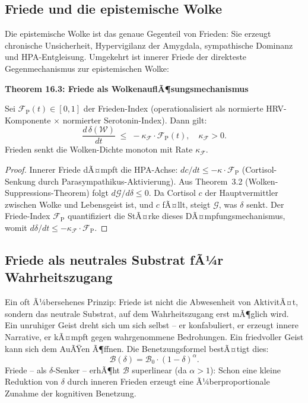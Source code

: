 ﻿\documentclass[12pt,a4paper]{report}
\theoremstyle{plain}
\theoremstyle{definition}
\theoremstyle{remark}
\begin{document}
	\subsection{Friede und die epistemische Wolke}

	Die epistemische Wolke ist das genaue Gegenteil von Frieden:
	Sie erzeugt chronische Unsicherheit, Hypervigilanz der Amygdala,
	sympathische Dominanz und HPA-Entgleisung.
	Umgekehrt ist innerer Friede der direkteste Gegenmechanismus
	zur epistemischen Wolke:

	
	\noindent\textbf{Theorem 16.3: Friede als WolkenauflÃ¶sungsmechanismus}

		Sei $\mathcal{F}_{\mathrm{P}}(t) \in [0,1]$ der Frieden-Index
		(operationalisiert als normierte HRV-Komponente
		$\times$ normierter Serotonin-Index).
		Dann gilt:
		\[
		\frac{d\,\delta(\mathcal{W})}{dt}
		\;\leq\; -\kappa_\mathcal{F} \cdot \mathcal{F}_{\mathrm{P}}(t),
		\quad \kappa_\mathcal{F} > 0.
		\]
		Frieden senkt die Wolken-Dichte monoton mit Rate $\kappa_\mathcal{F}$.


	\begin{proof}
		Innerer Friede dÃ¤mpft die HPA-Achse: $dc/dt \leq -\kappa \cdot \mathcal{F}_{\mathrm{P}}$
		(Cortisol-Senkung durch Parasympathikus-Aktivierung).
		Aus Theorem~3.2 (Wolken-Suppressions-Theorem) folgt $d\mathcal{G}/d\delta \leq 0$.
		Da Cortisol $c$ der Hauptvermittler zwischen Wolke und Lebensgeist ist,
		und $c$ fÃ¤llt, steigt $\mathcal{G}$, was $\delta$ senkt.
		Der Friede-Index $\mathcal{F}_{\mathrm{P}}$ quantifiziert die StÃ¤rke
		dieses DÃ¤mpfungsmechanismus, womit $d\delta/dt \leq -\kappa_\mathcal{F} \cdot \mathcal{F}_{\mathrm{P}}$. \hfill
	\end{proof}

	\subsection{Friede als neutrales Substrat fÃ¼r Wahrheitszugang}

	Ein oft Ã¼bersehenes Prinzip: Friede ist nicht die Abwesenheit
	von AktivitÃ¤t, sondern das neutrale Substrat, auf dem Wahrheitszugang
	erst mÃ¶glich wird.
	Ein unruhiger Geist dreht sich um sich selbst -- er konfabuliert,
	er erzeugt innere Narrative, er kÃ¤mpft gegen wahrgenommene Bedrohungen.
	Ein friedvoller Geist kann sich dem AuÃŸen Ã¶ffnen.
	Die Benetzungsformel bestÃ¤tigt dies:
	\[
	\mathcal{B}(\delta) = \mathcal{B}_0 \cdot (1-\delta)^\alpha.
	\]
	Friede -- als $\delta$-Senker -- erhÃ¶ht $\mathcal{B}$ superlinear
	(da $\alpha > 1$): Schon eine kleine Reduktion von $\delta$ durch
	inneren Frieden erzeugt eine Ã¼berproportionale Zunahme der
	kognitiven Benetzung.
\end{document}
